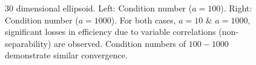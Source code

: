 \begin{figure}[h!]
\begin{minipage}[b]{0.5\linewidth}
 \centering
\end{minipage}
\begin{minipage}[b]{0.5\linewidth}
 \centering
\end{minipage}
\caption{30 dimensional ellipsoid. Left: Condition number ($a=100$).  Right: Condition number ($a=1000$). For both cases, $a=10$ \& $a=1000$, significant losses in efficiency due to variable correlations (non-separability) are observed. Condition numbers of $100 - 1000$ demonstrate similar convergence.} 

\label{ellipse_t2}
\end{figure}

